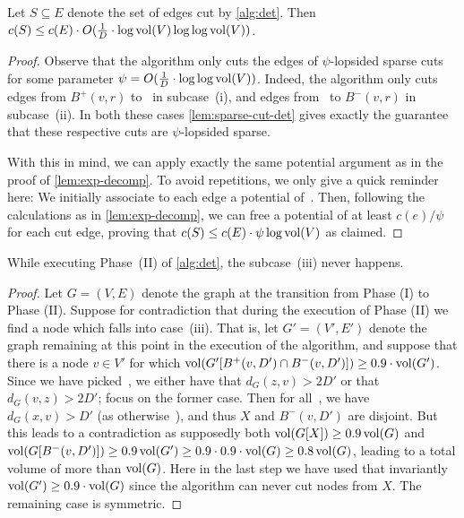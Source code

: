 \documentclass[letterpaper,11pt]{article}
\begin{document}
\begin{lemma} \label{lem:ldd-det-cost}
Let $S \subseteq E$ denote the set of edges cut by \cref{alg:det}. Then $c(S) \leq c(E) \cdot O(\frac{1}{D} \cdot \log \operatorname{vol}(V) \log\log \operatorname{vol}(V))$.
\end{lemma}
\begin{proof}
Observe that the algorithm only cuts the edges of $\psi$-lopsided sparse cuts for some parameter $\psi = O(\frac{1}{D} \cdot \log\log \operatorname{vol}(V))$. Indeed, the algorithm only cuts edges from $B^+(v, r)$ to~ in subcase~(i), and edges from~ to $B^-(v, r)$ in subcase~(ii). In both these cases \cref{lem:sparse-cut-det} gives exactly the guarantee that these respective cuts are $\psi$-lopsided sparse.

With this in mind, we can apply exactly the same potential argument as in the proof of \cref{lem:exp-decomp}. To avoid repetitions, we only give a quick reminder here: We initially associate to each edge a potential of~. Then, following the calculations as in \cref{lem:exp-decomp}, we can free a potential of at least $c(e) / \psi$ for each cut edge, proving that $c(S) \leq c(E) \cdot \psi \log\operatorname{vol}(V)$ as claimed.
\end{proof}

\begin{lemma} \label{lem:ldd-det-well-defined}
While executing Phase~(II) of \cref{alg:det}, the subcase~(iii) never happens.
\end{lemma}
\begin{proof}
Let $G = (V, E)$ denote the graph at the transition from Phase (I) to Phase (II). Suppose for contradiction that during the execution of Phase (II) we find a node which falls into case~(iii). That is, let $G' = (V', E')$ denote the graph remaining at this point in the execution of the algorithm, and suppose that there is a node $v \in V'$ for which $\operatorname{vol}(G'[B^+(v, D') \cap B^-(v, D')]) \geq 0.9 \cdot \operatorname{vol}(G')$. Since we have picked~, we either have that $d_G(z, v) > 2D'$ or that $d_G(v, z) > 2D'$; focus on the former case. Then for all~, we have $d_G(x, v) > D'$ (as otherwise~), and thus $X$ and $B^-(v, D')$ are disjoint. But this leads to a contradiction as supposedly both $\operatorname{vol}(G[X]) \geq 0.9 \operatorname{vol}(G)$ and $\operatorname{vol}(G[B^-(v, D')]) \geq 0.9 \operatorname{vol}(G') \geq 0.9 \cdot 0.9 \cdot \operatorname{vol}(G) \geq 0.8 \operatorname{vol}(G)$, leading to a total volume of more than $\operatorname{vol}(G)$. Here in the last step we have used that invariantly $\operatorname{vol}(G') \geq 0.9 \cdot \operatorname{vol}(G)$ since the algorithm can never cut nodes from $X$. The remaining case is symmetric.
\end{proof}
\end{document}
